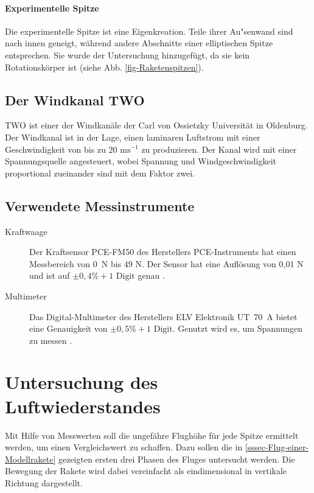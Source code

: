 \documentclass[10pt,a4paper]{article}
\begin{document}
\paragraph{Experimentelle Spitze}
Die experimentelle Spitze ist eine Eigenkreation. Teile ihrer Au"senwand sind nach innen geneigt, während andere Abschnitte einer elliptischen Spitze entsprechen. Sie wurde der Untersuchung hinzugefügt, da sie kein Rotationskörper ist (siehe Abb. \ref{fig-Raketenspitzen}).


\subsection{Der Windkanal TWO}

TWO ist einer der Windkanäle der Carl von Ossietzky Universität in Oldenburg.
Der Windkanal ist in der Lage, einen laminaren Luftstrom mit einer Geschwindigkeit von bis zu $20 \text{ ms}^{-1}$ zu produzieren. Der Kanal wird mit einer Spannungsquelle angesteuert, wobei Spannung und Windgeschwindigkeit proportional zueinander sind mit dem Faktor zwei.


\subsection{Verwendete Messinstrumente}

\begin{description}
	\item[Kraftwaage] Der Kraftsensor PCE-FM50 des Herstellers PCE-Instruments hat einen Messbereich von 0~N bis 49 N. Der Sensor hat eine Auflösung von 0,01 N und ist auf $\pm 0,4 \% + 1 \text{ Digit}$ genau \cite{pce}.
	
	\item [Multimeter] Das Digital-Multimeter des Herstellers ELV Elektronik UT~70~A bietet eine Genauigkeit von $\pm0,5 \% + 1 \text{ Digit}$. Genutzt wird es, um Spannungen zu messen \cite{elv}.
\end{description}



\section{Untersuchung des Luftwiederstandes}

Mit Hilfe von Messwerten soll die ungefähre Flughöhe für jede Spitze ermittelt werden, um einen Vergleichswert zu schaffen. Dazu sollen die in \ref{sssec-Flug-einer-Modellrakete} gezeigten ersten drei Phasen des Fluges untersucht werden. Die Bewegung der Rakete wird dabei vereinfacht als eindimensional in vertikale Richtung dargestellt. 
\end{document}

